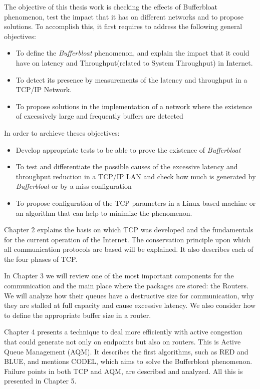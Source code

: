 The objective of this thesis work is checking the effects of
Bufferbloat phenomenon, test the impact that it has on different networks
and to propose solutions. To accomplish this, it first requires to
address the following general objectives:

\begin{itemize}
	\item To define the \textit{Bufferbloat} phenomenon, and explain the impact that it could have on latency and \gls{Throughput}(related to \gls{System Throughput}) in Internet.
	\item To detect its presence by measurements of the latency and throughput in a TCP/IP Network.
	\item To propose solutions in the implementation of a network where the existence of excessively large and frequently buffers are detected
\end{itemize}

In order to archieve theses objectives:

\begin{itemize}
\item Develop appropriate tests to be able to prove the existence of \textit{Bufferbloat}
\item To test and differentiate the possible causes of the excessive latency and throughput reduction in a TCP/IP LAN and check how much is generated by \textit{Bufferbloat} or by a miss-configuration
\item To propose configuration of the TCP parameters in a Linux based machine or an algorithm that can help to minimize the phenomenon.
\end{itemize}

Chapter 2 explains the basis on which TCP was developed and
the fundamentals for the current operation of the Internet. The conservation
principle upon which all communication protocols are based will be explained.
It also describes each of the four phases of TCP.

In Chapter 3 we will review one of the most important components for the
communication and the main place where the packages are stored: the Routers.
We will analyze how their queues have a destructive size for
communication, why they are stalled at full capacity and cause excessive
latency. We also consider how to define the appropriate buffer size in a router.

Chapter 4 presents a technique to deal more efficiently with
active congestion that could generate not only on endpoints but also on
routers. This is Active Queue Management (AQM). It describes the first
algorithms, such as RED and BLUE, and mentions
CODEL, which aims to solve the Bufferbloat phenomenon. Failure points
in both TCP and AQM, are described and analyzed. All this is presented in
Chapter 5.

